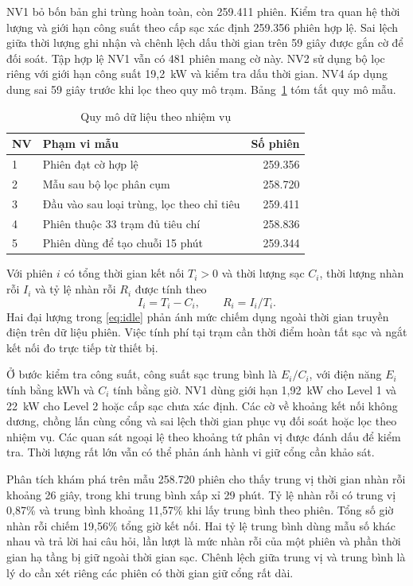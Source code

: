 \documentclass[conference,a4paper]{IEEEtran}
\begin{document}
NV1 bỏ bốn bản ghi trùng hoàn toàn, còn 259.411 phiên. Kiểm tra quan hệ thời lượng và giới hạn công suất theo cấp sạc xác định 259.356 phiên hợp lệ. Sai lệch giữa thời lượng ghi nhận và chênh lệch dấu thời gian trên 59 giây được gắn cờ để đối soát. Tập hợp lệ NV1 vẫn có 481 phiên mang cờ này. NV2 sử dụng bộ lọc riêng với giới hạn công suất 19,2~kW và kiểm tra dấu thời gian. NV4 áp dụng dung sai 59 giây trước khi lọc theo quy mô trạm. Bảng~\ref{tab:samples} tóm tắt quy mô mẫu.

\begin{table}[!t]
\caption{Quy mô dữ liệu theo nhiệm vụ}
\label{tab:samples}
\centering\footnotesize
\begin{tabularx}{\columnwidth}{@{}lXr@{}}
\toprule
\textbf{NV} & \textbf{Phạm vi mẫu} & \textbf{Số phiên} \\
\midrule
1 & Phiên đạt cờ hợp lệ & 259.356 \\
2 & Mẫu sau bộ lọc phân cụm & 258.720 \\
3 & Đầu vào sau loại trùng, lọc theo chỉ tiêu & 259.411 \\
4 & Phiên thuộc 33 trạm đủ tiêu chí & 258.836 \\
5 & Phiên dùng để tạo chuỗi 15 phút & 259.344 \\
\bottomrule
\end{tabularx}
\end{table}

Với phiên $i$ có tổng thời gian kết nối $T_i>0$ và thời lượng sạc $C_i$, thời lượng nhàn rỗi $I_i$ và tỷ lệ nhàn rỗi $R_i$ được tính theo
\begin{equation}
I_i=T_i-C_i,\qquad R_i=I_i/T_i.
\label{eq:idle}
\end{equation}
Hai đại lượng trong \eqref{eq:idle} phản ánh mức chiếm dụng ngoài thời gian truyền điện trên dữ liệu phiên. Việc tính phí tại trạm cần thời điểm hoàn tất sạc và ngắt kết nối đo trực tiếp từ thiết bị.

Ở bước kiểm tra công suất, công suất sạc trung bình là $E_i/C_i$, với điện năng $E_i$ tính bằng kWh và $C_i$ tính bằng giờ. NV1 dùng giới hạn 1,92~kW cho Level 1 và 22~kW cho Level 2 hoặc cấp sạc chưa xác định. Các cờ về khoảng kết nối không dương, chồng lấn cùng cổng và sai lệch thời gian phục vụ đối soát hoặc lọc theo nhiệm vụ. Các quan sát ngoại lệ theo khoảng tứ phân vị được đánh dấu để kiểm tra. Thời lượng rất lớn vẫn có thể phản ánh hành vi giữ cổng cần khảo sát.

Phân tích khám phá trên mẫu 258.720 phiên cho thấy trung vị thời gian nhàn rỗi khoảng 26 giây, trong khi trung bình xấp xỉ 29 phút. Tỷ lệ nhàn rỗi có trung vị 0,87\% và trung bình khoảng 11,57\% khi lấy trung bình theo phiên. Tổng số giờ nhàn rỗi chiếm 19,56\% tổng giờ kết nối. Hai tỷ lệ trung bình dùng mẫu số khác nhau và trả lời hai câu hỏi, lần lượt là mức nhàn rỗi của một phiên và phần thời gian hạ tầng bị giữ ngoài thời gian sạc. Chênh lệch giữa trung vị và trung bình là lý do cần xét riêng các phiên có thời gian giữ cổng rất dài.
\end{document}
